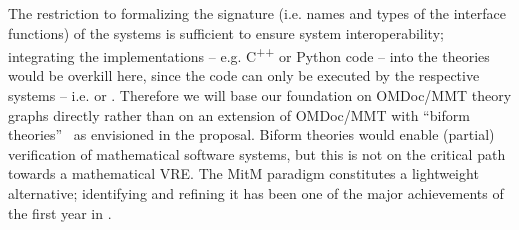 The restriction to formalizing the signature (i.e. names and types of the interface
functions) of the systems is sufficient to ensure system interoperability; integrating the
implementations -- e.g. C\textsuperscript{++} or Python code -- into the theories would
be overkill here, since the code can only be executed by the respective systems --
i.e. \GAP or \SageMath. Therefore we will base our foundation on OMDoc/MMT theory graphs
directly rather than on an extension of OMDoc/MMT with ``biform
theories''~\cite{KohManRab:aumftg13,Farmer:btc07} as envisioned in the proposal. Biform
theories would enable (partial) verification of mathematical software systems, but this is
not on the critical path towards a mathematical VRE. The MitM paradigm constitutes a
lightweight alternative; identifying and refining it has been one of the major
achievements of the first year in .
